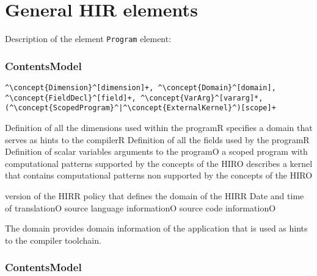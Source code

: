 \section{General HIR elements}


Description of the element {\tt Program} element:

\subsubsection*{ContentsModel}{}

\begin{lstlisting}[style=default]
^\concept{Dimension}^[dimension]+, ^\concept{Domain}^[domain], ^\concept{FieldDecl}^[field]+, ^\concept{VarArg}^[vararg]*, (^\concept{ScopedProgram}^|^\concept{ExternalKernel}^)[scope]+
\end{lstlisting}

\begin{HIRChildElements}
{Definition of all the dimensions used within the program}{R}
{specifies a domain that serves as hints to the compiler}{R}
{Definition of all the fields used by the program}{R}
{Definition of scalar variables arguments to the program}{O}
{a scoped program with computational patterns supported by the concepts of the HIR}{O}
{describes a kernel that contains computational patterns non supported by the concepts of the HIR}{O}
\end{HIRChildElements}

\begin{HIRAttributes}
{version of the HIR}{R}
{policy that defines the domain of the HIR}{R}
{Date and time of translation}{O}
{source language information}{O}
{source code information}{O}
\end{HIRAttributes}


The domain provides domain information of the application that is used as hints to the compiler toolchain.

\subsubsection*{ContentsModel}{}


